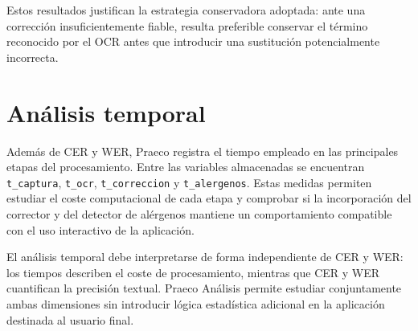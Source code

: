 Estos resultados justifican la estrategia conservadora adoptada: ante una corrección insuficientemente fiable, resulta preferible conservar el término reconocido por el OCR antes que introducir una sustitución potencialmente incorrecta.

\section{Análisis temporal}

Además de CER y WER, Praeco registra el tiempo empleado en las principales etapas del procesamiento. Entre las variables almacenadas se encuentran \texttt{t\_captura}, \texttt{t\_ocr}, \texttt{t\_correccion} y \texttt{t\_alergenos}. Estas medidas permiten estudiar el coste computacional de cada etapa y comprobar si la incorporación del corrector y del detector de alérgenos mantiene un comportamiento compatible con el uso interactivo de la aplicación.

El análisis temporal debe interpretarse de forma independiente de CER y WER: los tiempos describen el coste de procesamiento, mientras que CER y WER cuantifican la precisión textual. Praeco Análisis permite estudiar conjuntamente ambas dimensiones sin introducir lógica estadística adicional en la aplicación destinada al usuario final.

